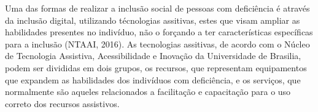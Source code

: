 \par Uma das formas de realizar a inclusão social de pessoas com deficiência é através da inclusão digital, utilizando técnologias assitivas, estes que visam ampliar as habilidades presentes no indivíduo, não o forçando a ter características específicas para a inclusão (NTAAI, 2016). As tecnologias assitivas, de acordo com o Núcleo de Tecnologia Assistiva, Acessibilidade e Inovação da Universidade de Brasilia, podem ser divididas em dois grupos, os recursos, que representam equipamentos que expandem as habilidades dos indivíduos com deficiência, e os serviços, que normalmente são aqueles relacionados a facilitação e capacitação para o uso correto dos recursos assistivos.







